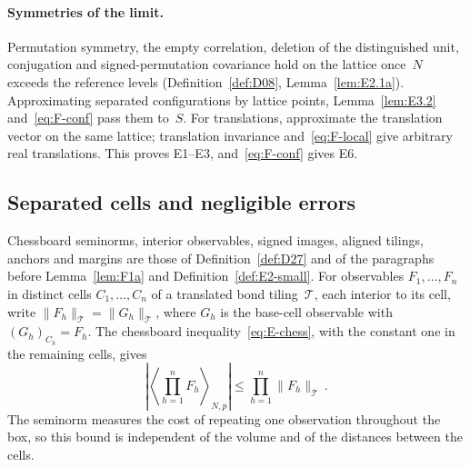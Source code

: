 \paragraph{Symmetries of the limit.} Permutation symmetry, the empty correlation, deletion of the distinguished unit, conjugation and signed-permutation covariance hold on the lattice once~$N$ exceeds the reference levels (Definition~\ref{def:D08}, Lemma~\ref{lem:E2.1a}). Approximating separated configurations by lattice points, Lemma~\ref{lem:E3.2} and~\eqref{eq:F-conf} pass them to~$S$. For translations, approximate the translation vector on the same lattice; translation invariance and~\eqref{eq:F-local} give arbitrary real translations. This proves E1--E3, and~\eqref{eq:F-conf} gives E6.

\subsection{Separated cells and negligible errors}\label{sec:partII-F.2}

Chessboard seminorms, interior observables, signed images, aligned tilings, anchors and margins are those of Definition~\ref{def:D27} and of the paragraphs before Lemma~\ref{lem:F1a} and Definition~\ref{def:E2-small}. For observables $F_1,\ldots,F_n$ in distinct cells $C_1,\ldots,C_n$ of a translated bond tiling~$\mathcal T$, each interior to its cell, write $\|F_h\|_{\mathcal T}=\|G_h\|_{\mathcal T}$, where $G_h$ is the base-cell observable with $(G_h)_{C_h}=F_h$. The chessboard inequality~\eqref{eq:E-chess}, with the constant one in the remaining cells, gives
\begin{equation}\label{eq:F-chess}
\left|\left\langle\prod_{h=1}^nF_h\right\rangle_{N,p}\right|
\le\prod_{h=1}^n\|F_h\|_{\mathcal T}\,.
\end{equation}
The seminorm measures the cost of repeating one observation throughout the box, so this bound is independent of the volume and of the distances between the cells.

